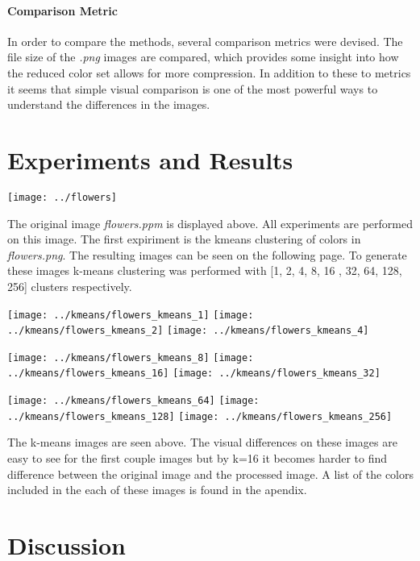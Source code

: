 \documentclass{article}
\begin{document}
\paragraph{Comparison Metric}
In order to compare the methods, several comparison metrics were devised. 
The file size of the \textit{.png} images are compared, which provides some
insight into how the reduced color set allows for more compression. In addition
to these to metrics it seems that simple visual comparison is one of the most
powerful ways to understand the differences in the images.


\newpage
\section*{Experiments and Results}
\newline
\centerline{\texttt{[image: ../flowers]}}
The original image \textit{flowers.ppm} is displayed above. All experiments
are performed on this image. The first expiriment is the kmeans clustering
of colors in \textit{flowers.png}. The resulting images can be seen on the following page. To generate these images k-means clustering was performed with [1, 2, 4, 8, 16
, 32, 64, 128, 256] clusters respectively.

\newpage
\centerline{
\texttt{[image: ../kmeans/flowers\_kmeans\_1]}
\texttt{[image: ../kmeans/flowers\_kmeans\_2]}
\texttt{[image: ../kmeans/flowers\_kmeans\_4]}}
\centerline{
\texttt{[image: ../kmeans/flowers\_kmeans\_8]}
\texttt{[image: ../kmeans/flowers\_kmeans\_16]}
\texttt{[image: ../kmeans/flowers\_kmeans\_32]}}
\centerline{
\texttt{[image: ../kmeans/flowers\_kmeans\_64]}
\texttt{[image: ../kmeans/flowers\_kmeans\_128]}
\texttt{[image: ../kmeans/flowers\_kmeans\_256]}}
The k-means images are seen above. The visual differences on these images are 
easy to see for the first couple images but by k=16 it becomes harder to find 
difference between the original image and the processed image. A list of the 
colors included in the each of these images is found in the apendix.
\newpage


\section*{Discussion}
\end{document}
